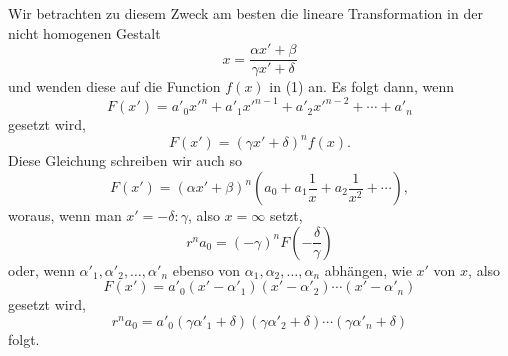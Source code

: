 \documentclass[11pt]{article}
\begin{document}
Wir betrachten zu diesem Zweck am besten die lineare Transformation in der nicht homogenen Gestalt
\begin{equation}
 x=\frac{\alpha x'+\beta}{\gamma x'+\delta}
\tag{15}
\end{equation}
und wenden diese auf die Function $f(x)$ in (1) an. Es folgt dann, wenn
\[
 F(x')=a'_0x'^n+a'_1x'^{n-1}+a'_2x'^{n-2}+\cdots+a'_n
\]
gesetzt wird,
\begin{equation}
 F(x')=(\gamma x'+\delta)^n f(x).
\tag{16}
\end{equation}
Diese Gleichung schreiben wir auch so
\[
 F(x')=(\alpha x'+\beta)^n
 \left(a_0+a_1\frac1x+a_2\frac1{x^2}+\cdots\right),
\]
woraus, wenn man $x'=-\delta:\gamma$, also $x=\infty$ setzt,
\[
 r^n a_0=(-\gamma)^n F\left(-\frac{\delta}{\gamma}\right)
\]
oder, wenn $\alpha'_1,\alpha'_2,\ldots,\alpha'_n$ ebenso von $\alpha_1,\alpha_2,\ldots,\alpha_n$ abhängen, wie $x'$ von $x$, also
\[
 F(x')=a'_0(x'-\alpha'_1)(x'-\alpha'_2)\cdots(x'-\alpha'_n)
\]
gesetzt wird,
\begin{equation}
 r^n a_0=a'_0(\gamma\alpha'_1+\delta)(\gamma\alpha'_2+\delta)\cdots(\gamma\alpha'_n+\delta)
\tag{17}
\end{equation}
folgt.
\end{document}
